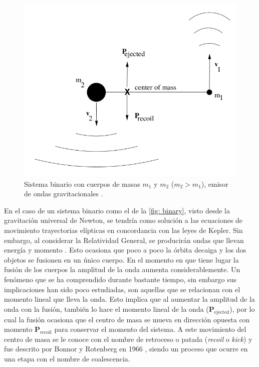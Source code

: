 	\begin{figure}[h]
		\centering
		\includegraphics[width=0.65\linewidth]{Figures/binarySystem}
		\caption{Sistema binario con cuerpos de masas $m_1$ y $m_2$ ($m_2 > m_1$), emisor de ondas gravitacionales \cite{hughes2005black}.}
		\label{fig: binary}
	\end{figure}
	
	En el caso de un sistema binario como el de la \autoref{fig: binary}, visto desde la gravitación universal de Newton, se tendría como solución a las ecuaciones de movimiento trayectorias elípticas en concordancia con las leyes de Kepler. Sin embargo, al considerar la Relatividad General, se producirán ondas que llevan energ\'ia y momento \cite{hughes2005black, hoyng2006gravitational, brugmann2018fundamentals}. Esto ocasiona que poco a poco la \'orbita decaiga y los dos objetos se fusionen en un \'unico cuerpo. En el momento en que tiene lugar la fusi\'on de los cuerpos la amplitud de la onda aumenta considerablemente. Un fen\'omeno que se ha comprendido durante bastante tiempo, sin embargo sus implicaciones han sido poco estudiadas, son aquellas que se relacionan con el momento lineal que lleva la onda. Esto implica que al aumentar la amplitud de la onda con la fusi\'on, tambi\'en lo hace el momento lineal de la onda ($\mathbf{P}_{\text{ejected}}$), por lo cual la fusi\'on ocasiona que el centro de masa se mueva en direcci\'on opuesta con momento $\mathbf{P}_{\text{recoil}}$ para conservar el momento del sistema. A este movimiento del centro de masa se le conoce con el nombre de retroceso o patada (\textit{recoil} o \textit{kick}) \cite{hughes2005black} y fue descrito por Bonnor y Rotenberg en 1966 \cite{bonnor1966gravitational}, siendo un proceso que ocurre en una etapa con el nombre de coalescencia.
	
